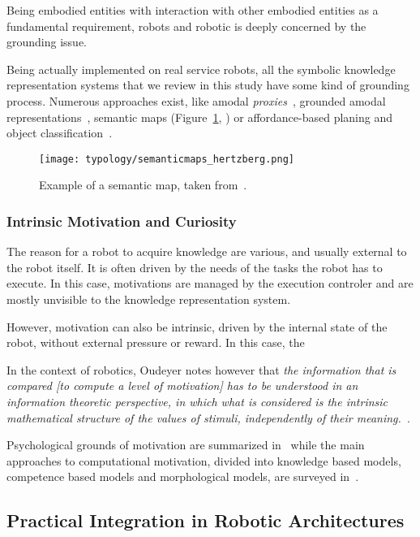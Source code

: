 Being embodied entities with interaction with other embodied entities as a
fundamental requirement, robots and robotic is deeply concerned by the
grounding issue.

Being actually implemented on real service robots, all the symbolic knowledge
representation systems that we review in this study have some kind of grounding
process. Numerous approaches exist, like amodal
\emph{proxies}~\cite{Jacobsson2008}, grounded amodal
representations~\cite{Alami2011, Mavridis2006}, semantic maps
(Figure~\ref{fig|semanticmap}, \cite{Nuechter2008, Galindo2008,Blodow2011}) or
affordance-based planing and object classification~\cite{Lorken2008,
Varadarajan2011}.

\begin{figure}
    \centering
    \texttt{[image: typology/semanticmaps\_hertzberg.png]}
    \caption{Example of a semantic map, taken from~\cite{Nuechter2008}.}
    \label{fig|semanticmap}
\end{figure}

\subsubsection{Intrinsic Motivation and Curiosity}

The reason for a robot to acquire knowledge are various, and usually external
to the robot itself. It is often driven by the needs of the tasks the robot has
to execute. In this case, motivations are managed by the execution controler
and are mostly unvisible to the knowledge representation system.

However, motivation can also be intrinsic, driven by the internal state of the
robot, without external pressure or reward. In this case, the 

In the context of robotics, Oudeyer notes however that \emph{the information that is
compared \emph{[to compute a level of motivation]} has to be understood in an
information theoretic perspective, in which what is considered is the intrinsic
mathematical structure of the values of stimuli, independently of their
meaning.}~\cite{Oudeyer2007}.

Psychological grounds of motivation are summarized in~\cite{Oudeyer2007} while
the main approaches to computational motivation, divided into knowledge based
models, competence based models and morphological models, are surveyed
in~\cite{Oudeyer2008}.

\subsection{Practical Integration in Robotic Architectures}
\label{sect|integration-robot}

